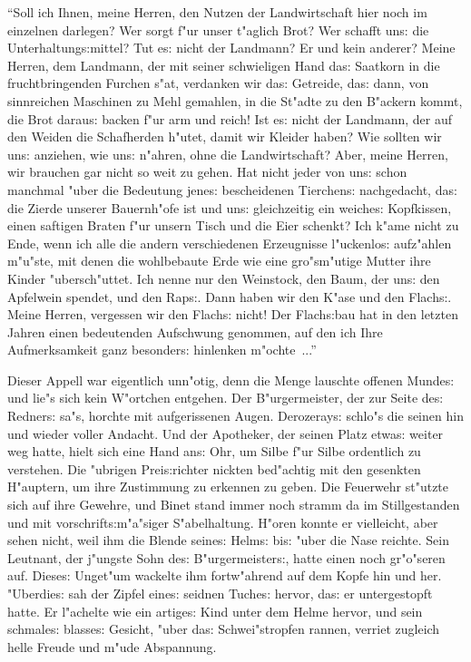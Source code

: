 \documentclass[oneside,12pt]{book}
\newcommand{\s}{s:}%
\begin{document}
"`Soll ich Ihnen, meine Herren, den Nutzen der Landwirtschaft hier
noch im einzelnen darlegen? Wer sorgt f"ur unser t"aglich Brot?
Wer schafft un{\s} die Unterhaltung{\s}mittel? Tut e{\s} nicht der
Landmann? Er und kein anderer? Meine Herren, dem Landmann, der mit
seiner schwieligen Hand da{\s} Saatkorn in die fruchtbringenden
Furchen s"at, verdanken wir da{\s} Getreide, da{\s} dann, von
sinnreichen Maschinen zu Mehl gemahlen, in die St"adte zu den
B"ackern kommt, die Brot darau{\s} backen f"ur arm und reich! Ist
e{\s} nicht der Landmann, der auf den Weiden die Schafherden
h"utet, damit wir Kleider haben? Wie sollten wir un{\s} anziehen,
wie un{\s} n"ahren, ohne die Landwirtschaft? Aber, meine Herren,
wir brauchen gar nicht so weit zu gehen. Hat nicht jeder von
un{\s} schon manchmal "uber die Bedeutung jene{\s} bescheidenen
Tierchen{\s} nachgedacht, da{\s} die Zierde unserer Bauernh"ofe
ist und un{\s} gleichzeitig ein weiche{\s} Kopfkissen, einen
saftigen Braten f"ur unsern Tisch und die Eier schenkt? Ich k"ame
nicht zu Ende, wenn ich alle die andern verschiedenen Erzeugnisse
l"uckenlo{\s} aufz"ahlen m"u"ste, mit denen die wohlbebaute Erde
wie eine gro"sm"utige Mutter ihre Kinder "ubersch"uttet. Ich nenne
nur den Weinstock, den Baum, der un{\s} den Apfelwein spendet, und
den Rap{\s}. Dann haben wir den K"ase und den Flach{\s}. Meine
Herren, vergessen wir den Flach{\s} nicht! Der Flach{\s}bau hat in
den letzten Jahren einen bedeutenden Aufschwung genommen, auf den
ich Ihre Aufmerksamkeit ganz besonder{\s} hinlenken m"ochte~..."'

Dieser Appell war eigentlich unn"otig, denn die Menge lauschte
offenen Munde{\s} und lie"s sich kein W"ortchen entgehen. Der
B"urgermeister, der zur Seite de{\s} Redner{\s} sa"s, horchte mit
aufgerissenen Augen. Derozeray{\s} schlo"s die seinen hin und
wieder voller Andacht. Und der Apotheker, der seinen Platz
etwa{\s} weiter weg hatte, hielt sich eine Hand an{\s} Ohr, um
Silbe f"ur Silbe ordentlich zu verstehen. Die "ubrigen
Prei{\s}richter nickten bed"achtig mit den gesenkten H"auptern, um
ihre Zustimmung zu erkennen zu geben. Die Feuerwehr st"utzte sich
auf ihre Gewehre, und Binet stand immer noch stramm da im
Stillgestanden und mit vorschrift{\s}m"a"siger S"abelhaltung.
H"oren konnte er vielleicht, aber sehen nicht, weil ihm die Blende
seine{\s} Helm{\s} bi{\s} "uber die Nase reichte. Sein Leutnant,
der j"ungste Sohn de{\s} B"urgermeister{\s}, hatte einen noch
gr"o"seren auf. Diese{\s} Unget"um wackelte ihm fortw"ahrend auf
dem Kopfe hin und her. "Uberdie{\s} sah der Zipfel eine{\s}
seidnen Tuche{\s} hervor, da{\s} er untergestopft hatte. Er
l"achelte wie ein artige{\s} Kind unter dem Helme hervor, und sein
schmale{\s} blasse{\s} Gesicht, "uber da{\s} Schwei"stropfen
rannen, verriet zugleich helle Freude und m"ude Abspannung.
\end{document}
